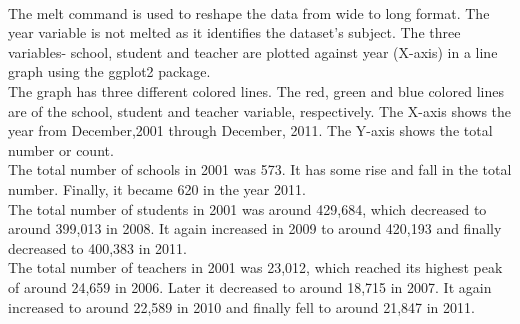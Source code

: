 \documentclass{article}\usepackage[]{graphicx}\usepackage[]{color}
\begin{document}
\\ The melt command is used to reshape the data from wide to long format. The year variable is not melted as it identifies the dataset's subject.
The three variables- school, student and teacher are plotted against year (X-axis) in a line graph using the ggplot2 package.\\

The graph has three different colored lines. The red, green and blue colored lines are of the school, student and teacher variable, respectively. The X-axis shows the year from December,2001 through December, 2011. The Y-axis shows the total number or count.
\\ The total number of schools in 2001 was 573. It has some rise and fall in the total number. Finally, it became 620 in the year 2011.
\\ The total number of students in 2001 was around 429,684, which decreased to around 399,013 in 2008. It again increased in 2009 to around 420,193 and finally decreased to 400,383 in 2011.
\\ The total number of teachers in 2001 was 23,012, which reached its highest peak of around 24,659 in 2006. Later it decreased to around 18,715 in 2007. It again increased to around 22,589 in 2010 and finally fell to around 21,847 in 2011.
\end{document}

